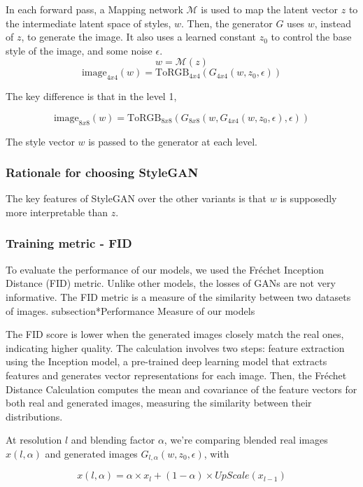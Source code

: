 \documentclass{article}
\begin{document}
In each forward pass, a Mapping network $\mathcal{M}$ is used to map the latent vector $z$ to the intermediate latent space of styles, $w$.
Then, the generator $G$ uses $w$, instead of $z$, to generate the image. It also uses a learned constant $z_0$ to control the base style of the image, and some noise $\epsilon$.
\[w = \mathcal{M}(z)\]
\[\text{image}_{4x4}(w) = \text{ToRGB}_{4x4}(G_{4x4}(w, z_0, \epsilon))\]

The key difference is that in the level 1, 

\[\text{image}_{8x8}(w) = \text{ToRGB}_{8x8}(G_{8x8}(w, G_{4x4}(w, z_0, \epsilon), \epsilon))\]

The style vector $w$ is passed to the generator at each level.

\subsubsection*{Rationale for choosing StyleGAN}

The key features of StyleGAN over the other variants is that $w$ is supposedly more interpretable than $z$.

\subsubsection*{Training metric - FID}

\quad To evaluate the performance of our models, we used the Fréchet Inception Distance (FID) metric. Unlike other models, the losses of GANs are not very informative. The FID metric is a measure of the similarity between two datasets of images. 
subsection*{Performance Measure of our models}

The FID score is lower when the generated images closely match the real ones, indicating higher quality. 
The calculation involves two steps: feature extraction using the Inception model, a pre-trained deep learning model that extracts features and generates vector representations for each image. 
Then, the Fréchet Distance Calculation computes the mean and covariance of the feature vectors for both real and generated images, measuring the similarity between their distributions.

At resolution $l$ and blending factor $\alpha$, we're comparing blended real images $x(l, \alpha)$ and generated images $G_{l, \alpha}(w, z_0, \epsilon)$, with

\[ x(l, \alpha) = \alpha \times x_{l} + (1-\alpha) \times UpScale(x_{l-1}) \]
\end{document}
